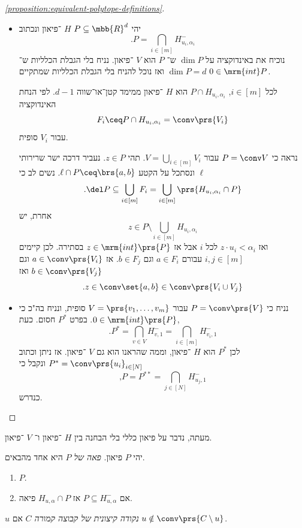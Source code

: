 \documentclass[a4paper,10pt,twoside,openany]{book}
\begin{document}
\begin{proof}[\ref{proposition:equivalent-polytope-definitions}]
\begin{itemize}
\item יהי
$P\subseteq \mbb{R}^d$
$H$%
־פיאון ונכתוב
\[\text{.} P = \bigcap_{i \in [m]} H_{u_i, \alpha_i}^-\]
נוכיח את באינדוקציה על
$\dim P$
ש־%
$P$
הוא
$V$%
־פיאון.
נניח בלי הגבלת הכלליות ש־%
$\dim P = d$
ואז נוכל להניח בלי הגבלת הכלליות שמתקיים
$0 \in \mrm{int}P$.

לכל
$i \in [m]$,
$P \cap H_{u_i, \alpha_i}$
הוא
$H$%
־פיאון ממימד קטן־או־שווה
$d-1$.
לפי הנחת האינדוקציה
\[F_i \ceq P \cap H_{u_i, \alpha_i} = \conv\prs{V_i}\]
עבור
$V_i$
סופית.

נראה כי
$P = \conv V$
עבור
$V = \bigcup_{i \in [m]} V_i$.
תהי
$z \in P$.
נעביר דרכה ישר שרירותי
$\ell$
ונסתכל על הקטע
$\ell \cap P \ceq \brs{a,b}$.
נשים לב כי
\[\text{.}\del P \subseteq \bigcup_{i \in [m]} F_i = \bigcup_{i \in [m]} \prs{H_{u_i, \alpha_i} \cap P}\]
אחרת, יש
\[z \in P \setminus \bigcup_{i \in [m]} H_{u_i, \alpha_i}\]
ואז
$z \cdot u_i < \alpha_i$
לכל
$i$
אבל אז
$z \in \mrm{int}\prs{P}$
בסתירה.
לכן קיימים
$i,j \in [m]$
עבורם
$a \in F_i$
וגם
$b \in F_j$.
אז
$a \in \conv\prs{V_i}$
וגם
$b \in \conv\prs{V_j}$
ואז
\[\text{.} z \in \conv\set{a,b} \in \conv\prs{V_i \cup V_j}\]

\item
נניח כי
$P = \conv\prs{V}$
עבור
$V = \prs{v_1, \ldots, v_m}$
סופית, ונניח בה"כ כי
$0 \in \mrm{int}\prs{P}$.
בפרט
$P^*$
חסום.
כעת,
\[\text{.} P^* = \bigcap_{v \in V} H_{v,1}^- = \bigcap_{i \in [m]} H_{v_i,1}^-\]
לכן
$P^*$
הוא
$H$%
־פיאון, וממה שהראנו הוא גם
$V$%
־פיאון.
אז ניתן וכתוב
$P^* = \conv\prs{u_i}_{i \in [N]}$
ונקבל כי
\[\text{,} P = P^{**} = \bigcap_{j \in [N]} H_{u_j,1}^-\]
כנדרש.
\end{itemize}
\end{proof}

מעתה, נדבר על פיאון כללי בלי הבחנה בין
$H$%
־פיאון ו־%
$V$%
־פיאון.

\begin{definition}
יהי
$P$
פיאון.
\emph{פאה של
$P$}
היא אחד מהבאים.
\begin{enumerate}
\item $P$.
\item אם
$P \subseteq H_{u,\alpha}^-$
אז
$H_{u,\alpha} \cap P$
פיאה.
\end{enumerate}
\end{definition}

\begin{definition}
$u$
\emph{נקודה קיצונית של קבוצה קמורה
$C$}
אם
$u \notin \conv\prs{C \setminus u}$.
\end{definition}
\end{document}
